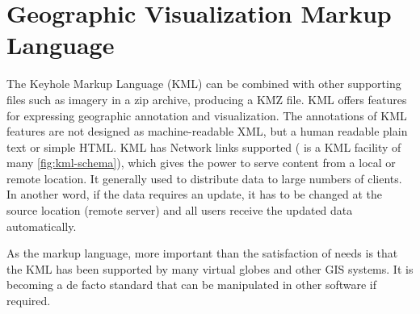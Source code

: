 \section{Geographic Visualization Markup Language}

The Keyhole Markup Language (KML) can be combined with other supporting files such as imagery in a zip archive, producing a KMZ file. KML offers features for expressing geographic annotation and visualization. The annotations of KML features are not designed as machine-readable XML, but a human readable plain text or simple HTML. KML has Network links supported ( is a KML facility of many \ref{fig:kml-schema}), which gives the power to serve content from a local or remote location. It generally used to distribute data to large numbers of clients. In another word, if the data requires an update, it has to be changed at the source location (remote server) and all users receive the updated data automatically.

As the markup language, more important than the satisfaction of needs is that the KML has been supported by many virtual globes and other GIS systems. It is becoming a de facto standard \cite{blower.sharing-visualizing.2007} that can be manipulated in other software if required.

